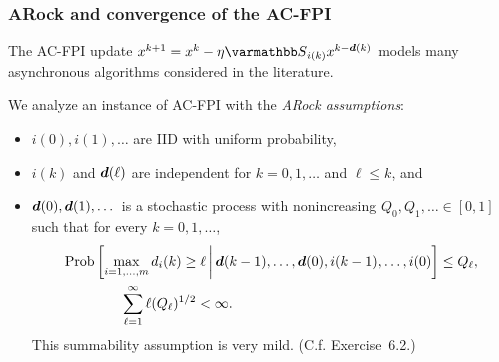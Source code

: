 \documentclass[10pt,mathserif]{beamer}
\begin{document}
\begin{frame}
\frametitle{ARock and convergence of the AC-FPI}
The AC-FPI update $x^{k+1}=x^k-\eta \opS_{i(k)}x^{k-\vecdelay(k)}$ models many asynchronous algorithms considered in the literature.

\vspace{0.2in}

We analyze an instance of AC-FPI with the \emph{ARock assumptions}:
\begin{itemize}
    \item $i(0),i(1),\dots$ are IID with uniform probability, 
    \item $i(k)$ and $\boldsymbol{d}(\ell)$ are independent for  $k=0,1,\dots$ and $\ell\le k$, and
    \item $\boldsymbol{d}(0),\boldsymbol{d}(1),\dots$ is a stochastic process %
    with nonincreasing $Q_0,Q_1,\ldots\in[0,1]$ such that for every $k=0,1,\dots$,
    \begin{align}
        &{\mathrm{Prob}}\left[\max_{i=1,\dots,m} d_i(k) \ge \ell 
        \,\bigg|\,
        \boldsymbol{d}(k-1),\dots,\boldsymbol{d}(0),i(k-1),\dots,i(0)
        \right]\le Q_\ell,\nonumber\\
        &\qquad\qquad\sum_{\ell=1}^{\infty}\ell (Q_\ell)^{1/2} < \infty.\label{eq:Plbnd}
      \end{align}
      This summability assumption is very mild. (C.f. Exercise~6.2.)
\end{itemize}
\end{frame}
\end{document}
